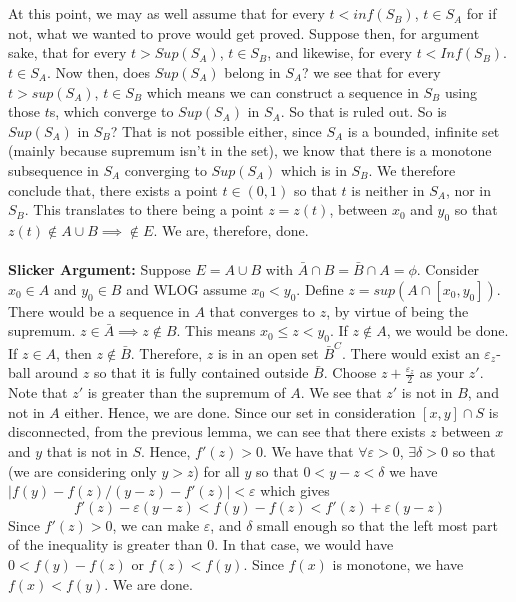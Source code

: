 \documentclass[../Main.tex]{subfiles}
\begin{document}
{\\\\ At this point, we may as well assume that for every $t<inf(S_B)$, $t \in S_A$ for if not, what we wanted to prove would get proved. 
Suppose then, for argument sake, that for every $t>Sup(S_A)$, $t\in S_B$, and
likewise, for every $t<Inf(S_B)$. $t \in S_A$. Now then, does $Sup(S_A)$ belong
in $S_A$? we see that for every $t>sup(S_A)$, $t \in S_B$ which means we can construct a sequence in $S_B$ using those $t$s, which converge to $Sup(S_A)$ in $S_A$. So that is ruled out.
So is $Sup(S_A)$ in $S_B$? That is not possible either, since $S_A$ is a bounded, infinite set (mainly because supremum isn't in the set), we know that there is a monotone subsequence in $S_A$ converging to $Sup(S_A)$ which is in $S_B$. We therefore conclude that, there exists a point $t \in (0,1)$ so that $t$ is neither in $S_A$, nor in $S_B$. This translates to there being a point $z=z(t)$, between $x_0$ and $y_0$ so that $z(t)\not\in A \cup B \implies \not\in E$. We are, therefore, done. 
\\\\ \textbf{Slicker Argument:} Suppose $E=A \cup B$ with $\bar{A}\cap B=\bar{B} \cap A=\phi$. Consider $x_0 \in A$ and $y_0 \in B$ and WLOG assume $x_0<y_0$. Define $z=sup(A\cap[x_0,y_0])$.
There would be a sequence in $A$ that converges to $z$, by virtue of being the supremum. $z \in \bar{A} \implies z \not\in B$. This means $x_0 \leq z<y_0$. If $z \not\in A$, we would be done.
If $z \in A$, then $z \not\in \bar{B}$. Therefore, $z$ is in an open set $\bar{B}^C$. There would exist
an $\varepsilon_z$-ball around $z$ so that it is fully contained outside $\bar{B}$. Choose $z+\frac{\varepsilon_z}{2}$ as your $z'$.
Note that $z'$ is greater than the supremum of $A$. We see that $z'$ is not in $B$, and not in $A$ either. Hence, we are done.
}
Since our set in consideration $[x,y]\cap S$ is disconnected, from the previous lemma, we can see that there exists $z$ between $x$ and $y$ that is not in $S$. Hence, $f'(z)>0$. We have that $\forall \varepsilon>0$, $\exists \delta>0$ so that (we are considering only $y>z$) for all $y$ so that $0<y-z<\delta$ we have $|f(y)-f(z)/(y-z)-f'(z)|<\varepsilon$ which gives $$f'(z)-\varepsilon(y-z)<f(y)-f(z)<f'(z)+\varepsilon(y-z) $$ Since $f'(z)>0$, we can make $\varepsilon$, and $\delta$ small enough so that the left most part of the inequality is greater than $0$. In that case, we would have $0<f(y)-f(z)$ or $f(z)<f(y)$. Since $f(x)$ is monotone, we have $f(x)<f(y)$. We are done.
\end{document}
